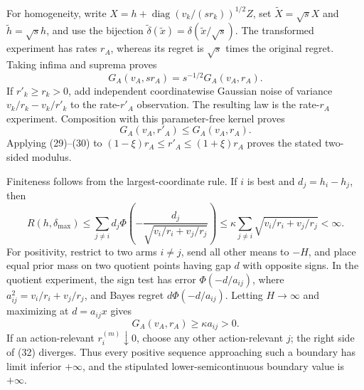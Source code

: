For homogeneity, write \(X=h+\operatorname{diag}(v_k/(sr_k))^{1/2}Z\), set \(\widetilde X=\sqrt sX\) and \(\widetilde h=\sqrt sh\), and use the bijection \(\widetilde\delta(\widetilde x)=\delta(\widetilde x/\sqrt s)\).  The transformed experiment has rates \(r_A\), whereas its regret is \(\sqrt s\) times the original regret.  Taking infima and suprema proves
\[
 G_A(v_A,sr_A)=s^{-1/2}G_A(v_A,r_A). \tag{29}
\]
If \(r'_k\geq r_k>0\), add independent coordinatewise Gaussian noise of variance \(v_k/r_k-v_k/r'_k\) to the rate-\(r'_A\) observation.  The resulting law is the rate-\(r_A\) experiment.  Composition with this parameter-free kernel proves
\[
G_A(v_A,r'_A)\leq G_A(v_A,r_A). \tag{30}
\]
Applying (29)--(30) to \((1-\xi)r_A\leq r'_A\leq(1+\xi)r_A\) proves the stated two-sided modulus.

Finiteness follows from the largest-coordinate rule.  If \(i\) is best and \(d_j=h_i-h_j\), then
\[
R(h,\delta_{\max})\leq\sum_{j\ne i}d_j
 \Phi\!\left(-\frac{d_j}{\sqrt{v_i/r_i+v_j/r_j}}\right)
\leq\kappa\sum_{j\ne i}\sqrt{v_i/r_i+v_j/r_j}<\infty. \tag{31}
\]
For positivity, restrict to two arms \(i\ne j\), send all other means to \(-H\), and place equal prior mass on two quotient points having gap \(d\) with opposite signs.  In the quotient experiment, the sign test has error \(\Phi(-d/a_{ij})\), where \(a_{ij}^2=v_i/r_i+v_j/r_j\), and Bayes regret \(d\Phi(-d/a_{ij})\).  Letting \(H\to\infty\) and maximizing at \(d=a_{ij}x\) gives
\[
G_A(v_A,r_A)\geq\kappa a_{ij}>0. \tag{32}
\]
If an action-relevant \(r_i^{(m)}\downarrow0\), choose any other action-relevant \(j\); the right side of (32) diverges.  Thus every positive sequence approaching such a boundary has limit inferior \(+\infty\), and the stipulated lower-semicontinuous boundary value is \(+\infty\).